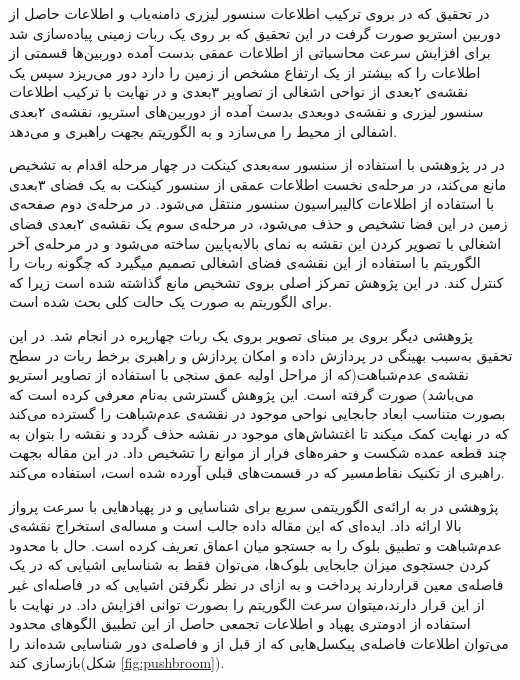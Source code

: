 در تحقیق که در  بروی ترکیب اطلاعات سنسور لیزری دامنه‌یاب و اطلاعات حاصل از دوربین استریو صورت گرفت در این تحقیق که بر روی یک ربات زمینی پیاده‌سازی شد برای افزایش سرعت محاسباتی از اطلاعات عمقی بدست آمده دوربین‌ها قسمتی از اطلاعات را که بیشتر از یک ارتفاع مشخص از زمین را دارد دور می‌ریزد سپس یک نقشه‌ی ۲بعدی از نواحی اشغالی از تصاویر ۳بعدی و در نهایت با ترکیب اطلاعات سنسور لیزری و نقشه‌ی دوبعدی بدست آمده از دوربین‌های استریو، نقشه‌ی ۲بعدی اشفالی از محیط را می‌سازد و به الگوریتم  بجهت راهبری و  می‌دهد.

در  در پژوهشی با استفاده از سنسور سه‌بعدی کینکت در چهار مرحله اقدام به تشخیص مانع می‌کند، در مرحله‌ی نخست اطلاعات عمقی از سنسور کینکت به یک فضای ۳بعدی با استفاده از اطلاعات کالیبراسیون سنسور منتقل می‌شود. در مرحله‌ی دوم صفحه‌ی زمین در این فضا تشخیص و حذف می‌شود، در مرحله‌ی سوم یک نقشه‌ی ۲بعدی فضای اشغالی با تصویر کردن این نقشه به نمای بالابه‌پایین ساخته می‌شود و در مرحله‌ی آخر الگوریتم  با استفاده از این نقشه‌ی فضای اشغالی تصمیم میگیرد که چگونه ربات را کنترل کند. در این پژوهش تمرکز اصلی بروی تشخیص مانع گذاشته شده است زیرا که برای الگوریتم  به صورت یک حالت کلی بحث شده است.

پژوهشی دیگر بروی  بر مبنای تصویر بروی یک ربات چهارپره در  انجام شد. در این تحقیق  به‌سبب بهینگی در پردازش داده و امکان پردازش و راهبری برخط ربات در سطح نقشه‌ی عدم‌شباهت(که از مراحل اولیه عمق سنجی با استفاده از تصاویر استریو می‌باشد) صورت گرفته است. این پژوهش گسترشی به‌نام  معرفی کرده است که بصورت متناسب ابعاد جابجایی نواحی موجود در نقشه‌ی عدم‌شباهت را گسترده می‌کند که در نهایت کمک میکند تا اغتشاش‌های موجود در نقشه حذف گردد و نقشه را بتوان به چند قطعه عمده شکست و حفره‌های فرار از موانع را تشخیص داد. در این مقاله بجهت راهبری از تکنیک نقاط‌مسیر که در قسمت‌های قبلی آورده شده است، استفاده می‌کند.

پژوهشی در  به ارائه‌ی الگوریتمی سریع برای شناسایی و  در پهپادهایی با سرعت پرواز بالا ارائه داد. ایده‌ای که این مقاله داده جالب است و مساله‌ی استخراج نقشه‌ی عدم‌شباهت و تطبیق بلوک را به جستجو میان اعماق تعریف کرده است. حال با محدود کردن جستجوی میزان جابجایی بلوک‌ها، می‌توان فقط به شناسایی اشیایی که در یک فاصله‌ی معین قراردارند پرداخت و به ازای در نظر نگرفتن اشیایی که در فاصله‌ای غیر از این قرار دارند،میتوان سرعت الگوریتم را بصورت توانی افزایش داد. در نهایت با استفاده از ادومتری پهپاد و اطلاعات تجمعی حاصل از این تطبیق الگوهای محدود می‌توان اطلاعات فاصله‌ی پیکسل‌هایی که از قبل از و فاصله‌ی دور شناسایی شده‌اند را بازسازی کند(شکل \ref{fig:pushbroom}).

